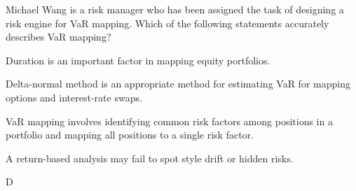 \documentclass{article}
\newcounter{question} %
\begin{document}
    
\begin{question}
    Michael Wang is a risk manager who has been assigned the task of designing a risk engine for VaR mapping. Which of the following statements accurately describes VaR mapping?
\end{question}

\begin{choices}
    \item Duration is an important factor in mapping equity portfolios.
    \item Delta-normal method is an appropriate method for estimating VaR for mapping options and interest-rate swaps.
    \item VaR mapping involves identifying common risk factors among positions in a portfolio and mapping all positions to a single risk factor.
    \item A return-based analysis may fail to spot style drift or hidden risks.
\end{choices}

\begin{correctanswer}
    D
\end{correctanswer}
\end{document}
